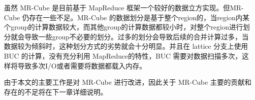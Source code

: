 虽然 MR-Cube 是目前基于 MapReduce 框架一个较好的数据立方实现。但MR-Cube 仍存在一些不足。MR-Cube 的数据划分是基于整个region的，当region内某个group的计算数据较大，而其他group的计算数据都较小时，对整个region进行划分就会导致一些group不必要的划分。过多的划分会导致后续的合并计算过多，当数据较为倾斜时，这种划分方式的劣势就会十分明显。并且在 lattice 分支上使用 BUC 的计算，没有充分利用 MapReduce的特性，BUC 需要对数据扫描多次，这样将导致多次I/O或者需要将数据都载入内存。

由于本文的主要工作是对 MR-Cube 进行改进，因此关于 MR-Cube 主要的贡献和存在的不足将在下一章详细说明。



